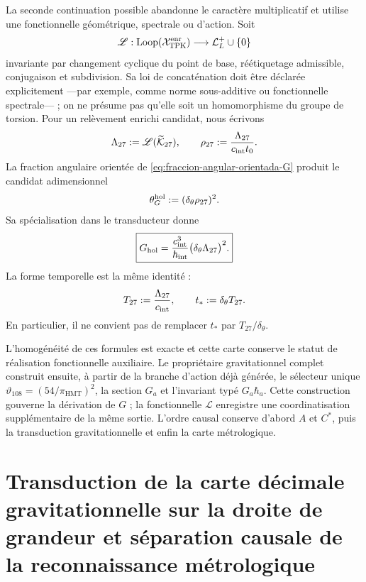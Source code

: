 La seconde continuation possible abandonne le caractère multiplicatif et utilise
une fonctionnelle géométrique, spectrale ou d'action. Soit
\[
 \mathscr L:
 \operatorname{Loop}(\mathcal X_{\rm TPK}^{\rm enr})
 \longrightarrow\mathcal L_L^+\cup\{0\}
\]
invariante par changement cyclique du point de base, réétiquetage admissible,
conjugaison et subdivision. Sa loi de concaténation doit être déclarée
explicitement ---par exemple, comme norme sous-additive ou fonctionnelle spectrale--- ;
on ne présume pas qu'elle soit un homomorphisme du groupe de torsion. Pour un
relèvement enrichi candidat, nous écrivons
\[
 \Lambda_{27}:=\mathscr L(\widetilde{\mathcal K}_{27}),
 \qquad
 \rho_{27}:=\frac{\Lambda_{27}}{c_{\rm int}t_0}.
\]
La fraction angulaire orientée de
\eqref{eq:fraccion-angular-orientada-G} produit le candidat adimensionnel
\[
 \theta_G^{\rm hol}:=(\delta_\theta\rho_{27})^2.
\]
Sa spécialisation dans le transducteur donne
\[
 \boxed{
 G_{\rm hol}
 =\frac{c_{\rm int}^{3}}{\hbar_{\rm int}}
  \bigl(\delta_\theta\Lambda_{27}\bigr)^2.}
\]
La forme temporelle est la même identité :
\[
 T_{27}:=\frac{\Lambda_{27}}{c_{\rm int}},
 \qquad
 t_\ast:=\delta_\theta T_{27}.
\]
En particulier, il ne convient pas de remplacer \(t_\ast\) par
\(T_{27}/\delta_\theta\).

L'homogénéité de ces formules est exacte et cette carte conserve le statut
de réalisation fonctionnelle auxiliaire. Le propriétaire gravitationnel complet
construit ensuite, à partir de la branche d'action déjà générée, le sélecteur unique
\(\vartheta_{108}=(54/\pi_{\mathrm{HMT}})^2\), la section \(G_a\) et
l'invariant typé \(G_a\hbar_a\). Cette construction gouverne la dérivation de
\(G\) ; la fonctionnelle \(\mathscr L\) enregistre une coordinatisation supplémentaire de
la même sortie. L'ordre causal conserve d'abord \(A\) et \(C^\ast\), puis
la transduction gravitationnelle et enfin la carte métrologique.

\section{Transduction de la carte décimale gravitationnelle sur la droite de grandeur et séparation causale de la reconnaissance métrologique}
\label{sec:lector-decimal-independiente-G}

